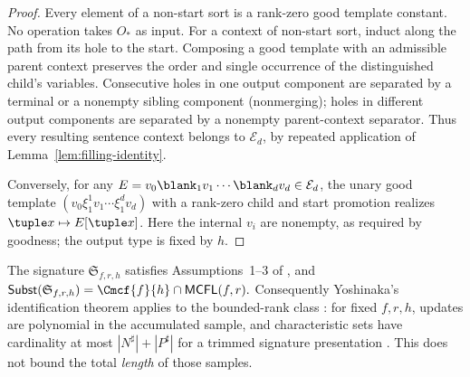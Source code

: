\begin{proof}
Every element of a non-start sort is a rank-zero
good template constant. No operation takes
$O_*$ as input. For a context of non-start
sort, induct along the path from its hole
to the start. Composing a good template with
an admissible parent context preserves the
order and single occurrence of the
distinguished child's variables.
Consecutive holes in one output component
are separated by a terminal or a nonempty
sibling component (nonmerging); holes in
different output components are separated
by a nonempty parent-context separator.
Thus every resulting sentence context
belongs to $\mathcal E_d$, by repeated
application of Lemma~\ref{lem:filling-identity}.

Conversely, for any
$E=v_0\blank_1v_1\cdots\blank_dv_d
\in\mathcal E_d$, the unary good template
$(v_0\xi_1^1v_1\cdots\xi_1^dv_d)$
with a rank-zero child and start promotion
realizes $\tuple x\mapsto E[\tuple x]$.
Here the internal $v_i$ are nonempty,
as required by goodness; the output type
is fixed by $h$.
\end{proof}

\begin{proposition}
\label{prop:yoshinaka2015-embedding}
The signature $\mathfrak S_{f,r,h}$ satisfies
Assumptions~1--3 of
\cite{Yoshinaka2015General}, and
\(\mathsf{Subst}(\mathfrak S_{f,r,h}) =\Cmcf{f}{h}\cap\mathsf{MCFL}(f,r).\)
Consequently Yoshinaka's identification theorem
applies to the bounded-rank class
\cite[Theorem~1]{Yoshinaka2015General}:
for fixed $f,r,h$, updates are polynomial
in the accumulated sample, and characteristic
sets have cardinality at most
$|N^\sharp|+|P^\sharp|$ for a trimmed
signature presentation
\cite[Lemma~3]{Yoshinaka2015General}.
This does not bound the total \emph{length}
of those samples.
\end{proposition}

